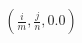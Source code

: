 \documentclass[preview]{standalone}
\begin{document}
\begin{align*}
\left( \frac{i}{m}, \frac{j}{n}, 0.0 \right)
\end{align*}
\end{document}
